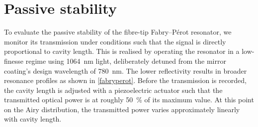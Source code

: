 \documentclass[../Thesis-IJspeert.tex]{subfiles}
\begin{document}
\section{Passive stability}
To evaluate the passive stability of the fibre-tip Fabry--Pérot resonator, we monitor its transmission under conditions such that the signal is directly proportional to cavity length. This is realised by operating the resonator in a low-finesse regime using \SI{1064}{\nano\meter} light, deliberately detuned from the mirror coating's design wavelength of \SI{780}{\nano\meter}. The lower reflectivity results in broader resonance profiles as shown in \autoref{fabryperot}. Before the transmission is recorded, the cavity length is adjusted with a piezoelectric actuator such that the transmitted optical power is at roughly \SI{50}{\percent} of its maximum value. At this point on the Airy distribution, the transmitted power varies approximately linearly with cavity length.
\end{document}
